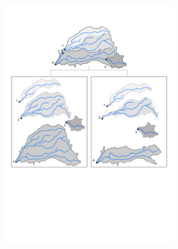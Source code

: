 \begin{figure}
	\centering
	\begin{subfigure}{0.7\textwidth}
  		\centering
 		 \includegraphics[width=\textwidth, trim={0 29.5cm 0 3.8cm}, clip=true]{plots/agg_and_inc_basins.pdf}
	\end{subfigure}%
	\hfill
	\begin{subfigure}{.35\textwidth}
  		\centering

\end{subfigure}
\end{figure}
